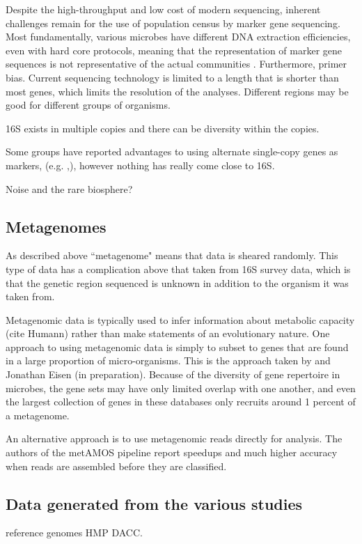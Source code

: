 \documentclass{amsart}
\begin{document}
Despite the high-throughput and low cost of modern sequencing, inherent challenges remain for the use of population census by marker gene sequencing.
Most fundamentally, various microbes have different DNA extraction efficiencies, even with hard core protocols, meaning that the representation of marker gene sequences is not representative of the actual communities \cite{morgan2010metagenomic}.
Furthermore, primer bias.
Current sequencing technology is limited to a length that is shorter than most genes, which limits the resolution of the analyses.
Different regions may be good for different groups of organisms.

16S exists in multiple copies and there can be diversity within the copies.
\citet{kembel2012incorporating}

Some groups have reported advantages to using alternate single-copy genes as markers, (e.g. \cite{case2007rpob},\cite{mcnabb2004hsp65}), however nothing has really come close to 16S.

Noise and the rare biosphere?


\subsection{Metagenomes}

As described above ``metagenome" means that data is sheared randomly.
This type of data has a complication above that taken from 16S survey data, which is that the genetic region sequenced is unknown in addition to the organism it was taken from.

Metagenomic data is typically used to infer information about metabolic capacity (cite Humann) rather than make statements of an evolutionary nature.
One approach to using metagenomic data is simply to subset to genes that are found in a large proportion of micro-organisms.
This is the approach taken by \citep{von2007quantitative,stark2010mltreemap} and Jonathan Eisen \citep{wu2008amphora} (in preparation).
Because of the diversity of gene repertoire in microbes, the gene sets may have only limited overlap with one another, and even the largest collection of genes in these databases only recruits around 1 percent of a metagenome.

An alternative approach is to use metagenomic reads directly for analysis.
The authors of the metAMOS pipeline \cite{treangen2013metamos} report speedups and much higher accuracy when reads are assembled before they are classified.


\subsection{Data generated from the various studies}
reference genomes
HMP DACC.
\end{document}

